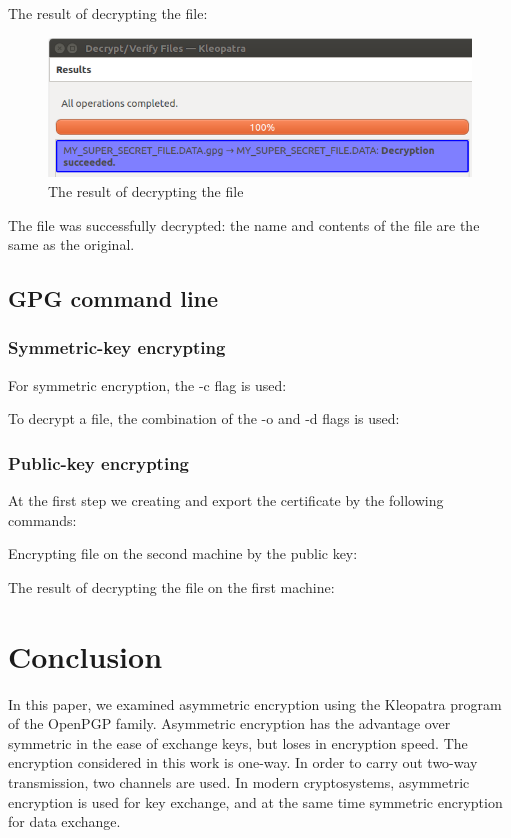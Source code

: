 \documentclass[14pt,a4paper,report]{report}
\begin{document}
The result of decrypting the file:

\begin{figure}[h!]
	\centering
	\includegraphics[scale = 0.6]{images/3_3.png}
	\caption{The result of decrypting the file}
\end{figure}

The file was successfully decrypted: the name and contents of the file are the same as the original.

\subsection{GPG command line}

\subsubsection{Symmetric-key encrypting}

For symmetric encryption, the -c flag is used:



To decrypt a file, the combination of the -o and -d flags is used:



\subsubsection{Public-key encrypting}

At the first step we creating and export the certificate by the following commands:



Encrypting file on the second machine by the public key:



The result of decrypting the file on the first machine:



\section{Conclusion}

In this paper, we examined asymmetric encryption using the Kleopatra program of the OpenPGP family. Asymmetric encryption has the advantage over symmetric in the ease of exchange keys, but loses in encryption speed. The encryption considered in this work is one-way. In order to carry out two-way transmission, two channels are used. In modern cryptosystems, asymmetric encryption is used for key exchange, and at the same time symmetric encryption for data exchange.
\end{document}

